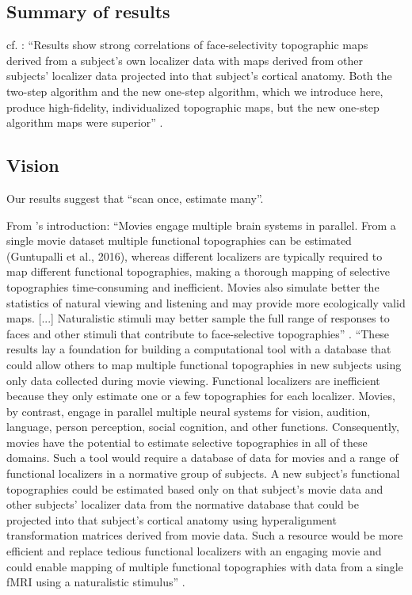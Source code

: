 \subsection{Summary of results}

%
cf. \citep{jiahui2020predicting}: ``Results show strong correlations of
face-selectivity topographic maps derived from a subject's own localizer data
with maps derived from other subjects' localizer data projected into that
subject's cortical anatomy. Both the two-step algorithm and the new one-step
algorithm, which we introduce here, produce high-fidelity, individualized
topographic maps, but the new one-step algorithm maps were superior''
\citep{jiahui2020predicting}.


\subsection{Vision}



Our results suggest that ``scan once, estimate many''.

%
From \citet{jiahui2020predicting}'s introduction: ``Movies engage multiple brain
systems in parallel. From a single movie dataset multiple functional
topographies can be estimated (Guntupalli et al., 2016), whereas different
localizers are typically required to map different functional topographies,
making a thorough mapping of selective topographies time-consuming and
inefficient. Movies also simulate better the statistics of natural viewing and
listening and may provide more ecologically valid maps. [...] Naturalistic
stimuli may better sample the full range of responses to faces and other stimuli
that contribute to face-selective topographies'' \citep{jiahui2020predicting}.
%
``These results lay a foundation for building a computational tool with a
database that could allow others to map multiple functional topographies in new
subjects using only data collected during movie viewing. Functional localizers
are inefficient because they only estimate one or a few topographies for each
localizer. Movies, by contrast, engage in parallel multiple neural systems for
vision, audition, language, person perception, social cognition, and other
functions.  Consequently, movies have the potential to estimate selective
topographies in all of these domains. Such a tool would require a database of
data for movies and a range of functional localizers in a normative group of
subjects. A new subject's functional topographies could be estimated based only
on that subject's movie data and other subjects' localizer data from the
normative database that could be projected into that subject's cortical anatomy
using hyperalignment transformation matrices derived from movie data. Such a
resource would be more efficient and replace tedious functional localizers with
an engaging movie and could enable mapping of multiple functional topographies
with data from a single fMRI using a naturalistic stimulus''
\citet{jiahui2020predicting}.


